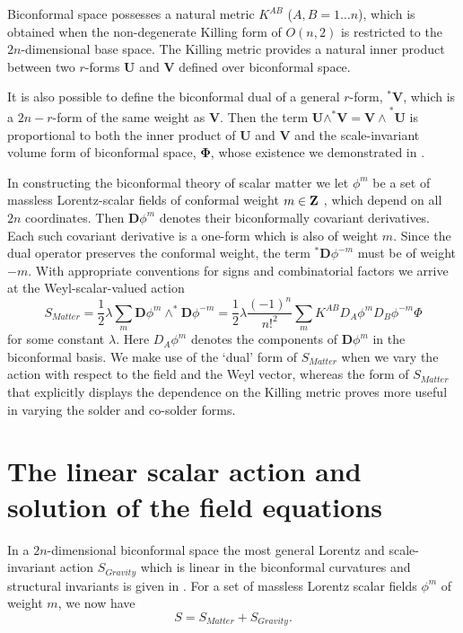 \documentclass[a4paper,a4paper]{article}
\begin{document}
Biconformal space possesses a natural metric $K^{AB}$ ($A,B=1\ldots n$),
which is obtained when the non-degenerate Killing form of $O(n,2)$ is
restricted to the $2n$-dimensional base space. The Killing metric provides a
natural inner product between two $r$-forms $\mathbf{U}$ and $\mathbf{V}$
defined over biconformal space.

It is also possible to define the biconformal dual of a general $r$-form, $%
^{\ast }\mathbf{V}$, which is a $2n-r$-form of the same weight as $\mathbf{V}
$. Then the term $\mathbf{U\mathbf{\wedge }^{\ast }V=V\wedge }^{\ast }%
\mathbf{U}$ is proportional to both the inner product of $\mathbf{U}$ and $%
\mathbf{V}$ and the scale-invariant volume form of biconformal space, $%
\mathbf{\Phi }$, whose existence we demonstrated in \cite{WW}.

In constructing the biconformal theory of scalar matter we let $\phi ^{m}$
be a set of massless Lorentz-scalar fields of conformal weight $m\in \mathbf{%
Z}$ \cite{Extended conformal paper}, which depend on all $2n$ coordinates.
Then $\mathbf{D}\phi ^{m}$ denotes their biconformally covariant
derivatives. Each such covariant derivative is a one-form which is also of
weight $m$. Since the dual operator preserves the conformal weight, the term 
$^{\ast }\mathbf{D}\phi ^{-m}$ must be of weight $-m$. With appropriate
conventions for signs and combinatorial factors we arrive at the
Weyl-scalar-valued action 
\[
S_{Matter}=\frac{1}{2}\lambda \sum_{m}\mathbf{D}\phi ^{m}\wedge ^{\ast }%
\mathbf{D}\phi ^{-m}=\frac{1}{2}\lambda \frac{(-1)^{n}}{n!^{2}}%
\sum_{m}K^{AB}D_{A}\phi ^{m}D_{B}\phi ^{-m}{\Phi } 
\]
for some constant $\lambda $. Here $D_{A}\phi ^{m}$ denotes the components
of $\mathbf{D}\phi ^{m}$ in the biconformal basis. We make use of the `dual'
form of $S_{Matter}$ when we vary the action with respect to the field and
the Weyl vector, whereas the form of $S_{Matter}$ that explicitly displays
the dependence on the Killing metric proves more useful in varying the
solder and co-solder forms.

\section{The linear scalar action and solution of the field equations}

In a $2n$-dimensional biconformal space the most general Lorentz and
scale-invariant action $S_{Gravity}$ which is linear in the biconformal
curvatures and structural invariants is given in \cite{WW}. For a set of
massless Lorentz scalar fields $\phi ^{m}$ of weight $m$, we now have 
\[
S=S_{Matter}+S_{Gravity}. 
\]
\end{document}
